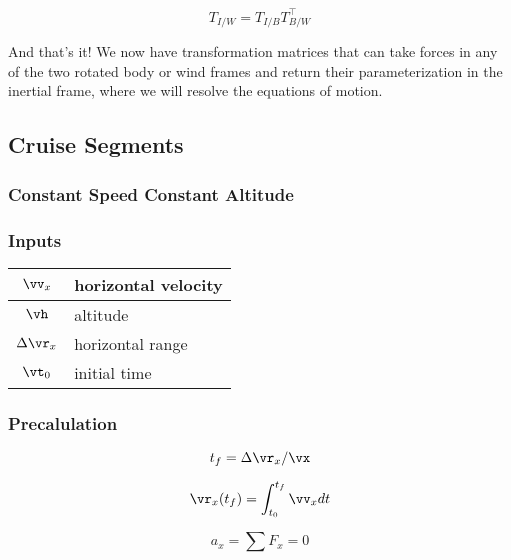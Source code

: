 \documentclass{article}
\begin{document}
\begin{equation}
T_{I/W} = T_{I/B} T_{B/W}^\top
\end{equation}

And that's it!  We now have transformation matrices that can take forces in any of the two rotated body or wind frames and return their parameterization in the inertial frame, where we will resolve the equations of motion.


\subsection{Cruise Segments}

\subsubsection{Constant Speed Constant Altitude}

\subsubsection*{Inputs}

\begin{table}[htb]
\begin{center}
\begin{tabular}{|c|l|}
\hline
    $\vv_x$         & horizontal velocity \\ \hline
	   $\vh$           & altitude            \\ \hline
    $\Delta \vr_x$  & horizontal range    \\ \hline
    $\vt_0$         & initial time        \\ \hline
\end{tabular}
\end{center}
\end{table}

\subsubsection*{Precalulation}

\begin{equation}
    t_f = \Delta \vr_x / \vx
\end{equation}

\begin{equation}
    \vr_x(t_f) = \int_{t_0}^{t_f} \vv_x dt
\end{equation}

\begin{equation}
    a_x = \sum F_x = 0
\end{equation}
\end{document}
